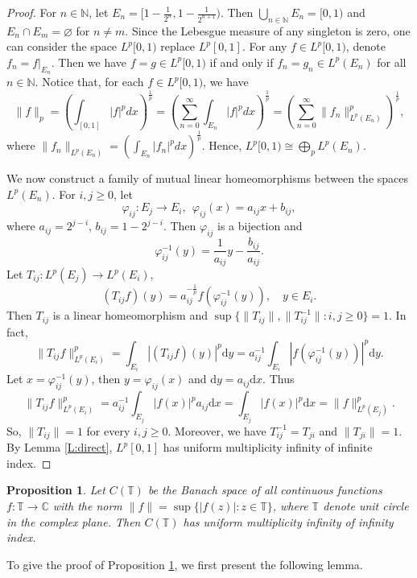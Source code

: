 \documentclass[12pt]{amsart}
\numberwithin{equation}{section}
\theoremstyle{plain}
\newtheorem{prop}[thm]{Proposition}
\theoremstyle{definition}
\newcommand{\bN}{{\mathbb{N}}}
\renewcommand{\phi}{\varphi}
\begin{document}
\begin{proof}
For $n\in \bN$, let $E_n = [1-\frac{1}{2^n}, 1-\frac{1}{2^{n+1}})$.
Then $\bigcup_{n \in \bN} E_n=[0,1)$ and $E_n \cap E_m=\varnothing$ for $n\neq m$.
Since the Lebesgue measure of any singleton is zero, one can consider the space $L^p[0,1)$ replace $L^p[0,1]$.
For any $f \in L^p[0,1)$, denote $f_n=f|_{E_n}$.
Then we have $f=g \in L^p[0,1)$ if and only if $f_n=g_n \in L^p(E_n)$ for all $n\in \bN$.
Notice that, for each $f \in L^p[0,1)$, we have
$$\|f\|_p=\left(\int_{[0,1]}|f|^p dx\right)^{\frac{1}{p}}=\left(\sum\limits_{n=0}^{\infty}\int_{E_n}|f|^p dx\right)^{\frac{1}{p}}=\left(\sum\limits_{n=0}^{\infty}\| f_n \|_{L^p(E_n)}^p\right)^{\frac{1}{p}},$$
where $\| f_n \|_{L^p(E_n)} =(\int_{E_n}|f_n|^p dx)^{\frac{1}{p}}$.
Hence, $L^p[0,1)\cong\bigoplus_{p}L^p(E_n)$.

We now construct a family of mutual linear homeomorphisms between the spaces $L^p(E_n)$.
For $i,j\geq 0$,
let
$$\phi_{ij}:E_j\rightarrow E_i,~~\phi_{ij}(x)=a_{ij}x+b_{ij},$$
where $a_{ij}=2^{j-i}$, $b_{ij}=1-2^{j-i}$.
Then $\phi_{ij}$ is a bijection and $$\phi_{ij}^{-1}(y)=\frac{1}{a_{ij}}y-\frac{b_{ij}}{a_{ij}}.$$
Let $T_{ij}:L^p(E_j)\rightarrow L^p(E_i)$,
$$(T_{ij}f)(y)=a_{ij}^{-\frac{1}{p}}f(\phi_{ij}^{-1}(y)),\quad y\in E_i.$$
Then $T_{ij}$ is a linear homeomorphism and $\sup\{\|T_{ij}\|,\|T_{ij}^{-1}\|:i,j\geq 0\}=1$.
In fact,
$$\|T_{ij}f\|^p_{L^p(E_i)}=\int_{E_i}|(T_{ij}f)(y)|^p \mathrm{d}y=a_{ij}^{-1}\int_{E_i}|f(\phi_{ij}^{-1}(y))|^p \mathrm{d}y.$$
Let $x=\phi_{ij}^{-1}(y)$, then $y=\phi_{ij}(x)$ and $\mathrm{d}y=a_{ij}\mathrm{d}x$. Thus
$$\|T_{ij}f\|^p_{L^p(E_i)}=a_{ij}^{-1}\int_{E_j}|f(x)|^p a_{ij}\mathrm{d}x=\int_{E_j}|f(x)|^p\mathrm{d}x=\|f\|_{L^p(E_j)}^p.$$
So, $\|T_{ij}\|=1$ for every $i,j\geq 0$.
Moreover, we have $T_{ij}^{-1}=T_{ji}$ and $\|T_{ji}\|=1$.
By Lemma \ref{L:direct}, $L^p[0,1]$ has uniform multiplicity infinity of infinite index.
\end{proof}

\begin{prop}\label{S3:cuni}
Let $C(\mathbb{T})$ be the Banach space of all continuous functions $f:\mathbb{T}\rightarrow \mathbb{C}$ with the norm $\|f\|=\sup\{|f(z)|:z\in\mathbb{T}\}$, where $\mathbb{T}$ denote unit circle in the complex plane.
Then $C(\mathbb{T})$ has uniform multiplicity infinity of infinity index.
\end{prop}
To give the proof of Proposition \ref{S3:cuni}, we first present the following lemma.
\end{document}
